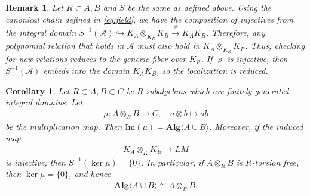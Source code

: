 \documentclass[11pt]{amsart}
\theoremstyle{definition}
\theoremstyle{plain}
\newtheorem{corollary}[theorem]{Corollary}
\newtheorem{remark}[theorem]{Remark}
\theoremstyle{conclusion}
\begin{document}
 \begin{remark}
     \label{re:36}
 Let $R\subset A,B$ and $S$ be the same as defined above. Using the canonical chain defined in \eqref{eq:field}, we have the composition of injectives from the integral domain $S^{-1}(\mathcal{A})  \hookrightarrow K_A\otimes_{K_R} K_B    \xrightarrow{ \ \varrho \  } K_A K_B $. Therefore, any polynomial relation that holds in $\mathcal{A}$ must also hold in $K_A\otimes_{K_R} K_B$. Thus, checking for \textit{new relations} reduces to the generic fiber over $K_R$.  If $\varrho$ is injective, then $S^{-1}(\mathcal{A})$ embeds into the domain $K_A K_B$, so the localization is reduced. %
 \end{remark}

 \begin{corollary} \label{cor:norela}
Let $R\subset A,B\subset C$ be $R$-subalgebras which are finitely generated integral domains. Let \begin{align*}
    \mu:A\otimes_R B\longrightarrow C,\quad a\otimes b\longmapsto ab
\end{align*} be the multiplication map. Then  $\mathrm{Im}(\mu)=\mathrm{\textbf{Alg}} \langle A\cup B\rangle$. Moreover, if the induced map \begin{align*}
  K_A\otimes_K K_B\longrightarrow LM 
\end{align*}  is injective, then $  S^{-1}(\ker\mu)=\{0\}$. %
In particular, if $A\otimes_R B$ is $R$-torsion free, then $\ker\mu=\{0\}$,  and hence \begin{align*}
    \textbf{Alg} \langle A\cup B\rangle \cong A\otimes_R B .
\end{align*} \end{corollary}
\end{document}

